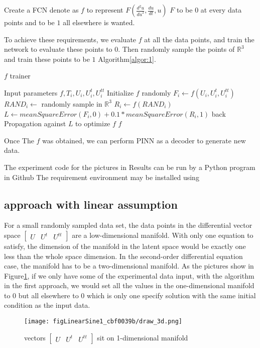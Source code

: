 \documentclass{article}
\begin{document}
Create a FCN denote as $f$ to represent
$F(\frac{d^2u}{{du}^2},\frac{du}{dt},u)$
$F$ to be $0$ at every data points and to be $1$ all elsewhere is wanted.

To achieve these requirements, we evaluate $f$ at all the data points,
and train the network to evaluate these points to $0$. Then randomly sample
the points of $\mathbb{R}^{3}$ and train these points to be $1$ Algorithm\ref{algor:1}.


\begin{algorithm}
    \caption{$f$ trainer}\label{algor:1}
    \begin{algorithmic}[1]
        \REQUIRE Input parameters $f,T_i, U_i, U^{t}_{i}, U^{tt}_{i}$
        \STATE Initialize $f$ randomly
        \REPEAT
        \STATE $F_i \leftarrow f(U_i,U^{t}_{i},U^{tt}_{i})$
        \STATE $RAND_i \leftarrow$ randomly sample in $\mathbb{R}^{3}$
        \STATE $R_i \leftarrow f(RAND_i)$
        \STATE $L \leftarrow meanSquareError(F_i,0)+0.1*meanSquareError(R_i,1)$
        \STATE back Propagation against $L$ to optimize $f$
        \RETURN $f$
    \end{algorithmic}
\end{algorithm}

Once The $f$ was obtained, we can perform PINN as a decoder
to generate new data.


The experiment code for the pictures in Results can
be run by a Python program in Github\cite[deSineTasks]{firstApproachGithubProject}
The requirement environment may be installed using\cite[reqs]{Envreqs}

\subsection{approach with linear assumption}
For a small randomly sampled data set, the data points
in the differential vector space
$\left[\begin{matrix}{U}&{U^{t}}&{U^{tt}}\end{matrix}\right]$
are a low-dimensional manifold. With only one equation to satisfy, the dimension of the manifold in the latent space would be exactly one less than the whole space dimension. In the second-order
differential equation case, the manifold has to be a two-dimensional
manifold. As the pictures show in Figure\ref{one:dimensionalmani},
if we only have some of the experimental data input, with
the algorithm in the first approach, we would set all the
values in the one-dimensional manifold to $0$ but all elsewhere
to $0$ which is only one specify solution with the same
initial condition as the input data.
\begin{figure}[ht!]
    \centering
    \texttt{[image: figLinearSine1\_cbf0039b/draw\_3d.png]}
    \caption{vectors $\left[\begin{matrix}{U}&{U^{t}}&{U^{tt}}\end{matrix}\right]$ sit on 1-dimensional manifold}
    \label{one:dimensionalmani}
\end{figure}
\end{document}
